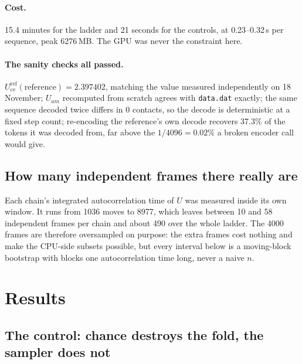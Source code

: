 \documentclass[11pt,a4paper]{article}
\begin{document}
\paragraph{Cost.} 15.4 minutes for the ladder and 21 seconds for the controls, at
0.23--0.32\,s per sequence, peak 6276\,MB. The GPU was never the constraint here.

\paragraph{The sanity checks all passed.}
$U_{\mathrm{ce}}^{\mathrm{ref}}(\mathrm{reference}) = 2.397402$, matching the value measured
independently on 18 November; $U_{am}$ recomputed from scratch agrees with
\texttt{data.dat} exactly; the same sequence decoded twice differs in 0 contacts, so the
decode is deterministic at a fixed step count; re-encoding the reference's own decode
recovers 37.3\% of the tokens it was decoded from, far above the $1/4096 = 0.02\%$ a broken
encoder call would give.

\subsection{How many independent frames there really are}

Each chain's integrated autocorrelation time of $U$ was measured inside its own window. It
runs from 1036 moves to 8977, which leaves between 10 and 58 independent frames per chain
and about 490 over the whole ladder. The 4000 frames are therefore oversampled on purpose:
the extra frames cost nothing and make the CPU-side subsets possible, but every interval
below is a moving-block bootstrap with blocks one autocorrelation time long, never a naive
$n$.

\section{Results}

\subsection{The control: chance destroys the fold, the sampler does not}
\end{document}
